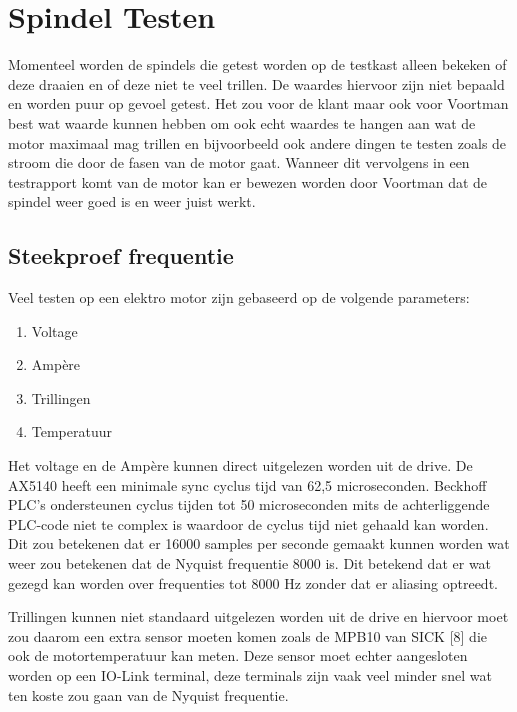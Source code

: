 \section{Spindel Testen}

Momenteel worden de spindels die getest worden op de testkast alleen bekeken of deze draaien en of deze niet te veel trillen. De waardes hiervoor zijn niet bepaald en worden puur op gevoel getest. Het zou voor de klant maar ook voor Voortman best wat waarde kunnen hebben om ook echt waardes te hangen aan wat de motor maximaal mag trillen en bijvoorbeeld ook andere dingen te testen zoals de stroom die door de fasen van de motor gaat. Wanneer dit vervolgens in een testrapport komt van de motor kan er bewezen worden door Voortman dat de spindel weer goed is en weer juist werkt.

\subsection{Steekproef frequentie}

Veel testen op een elektro motor zijn gebaseerd op de volgende parameters:

\begin{enumerate}
	\item Voltage
	\item Ampère
	\item Trillingen
	\item Temperatuur
\end{enumerate}

Het voltage en de Ampère kunnen direct uitgelezen worden uit de drive. De \gls{AX5140} heeft een minimale sync cyclus tijd van 62,5 microseconden. Beckhoff \gls{PLC}’s ondersteunen cyclus tijden tot 50 microseconden mits de achterliggende \gls{PLC}-code niet te complex is waardoor de cyclus tijd niet gehaald kan worden. Dit zou betekenen dat er 16000 samples per seconde gemaakt kunnen worden wat weer zou betekenen dat de Nyquist frequentie 8000 is. Dit betekend dat er wat gezegd kan worden over frequenties tot 8000 Hz zonder dat er aliasing optreedt.

\vspace{0.5cm}

Trillingen kunnen niet standaard uitgelezen worden uit de drive en hiervoor moet zou daarom een extra sensor moeten komen zoals de MPB10 van SICK [8] die ook de motortemperatuur kan meten. Deze sensor moet echter aangesloten worden op een IO-Link terminal, deze terminals zijn vaak veel minder snel wat ten koste zou gaan van de Nyquist frequentie.

